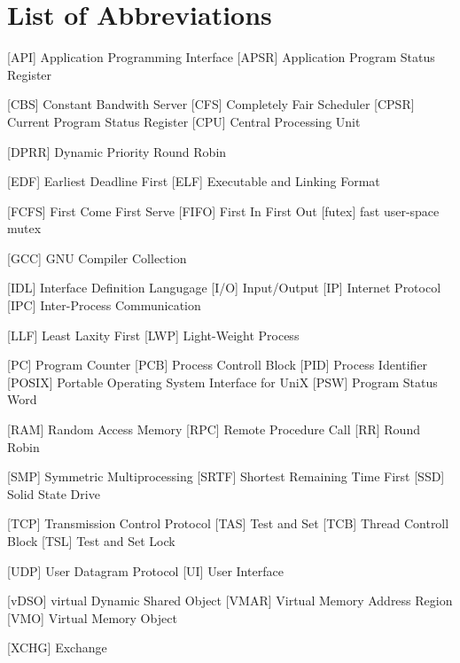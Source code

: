 
\chapter*{List of Abbreviations}

\begin{acronym} [POSIX]
 [API] {Application Programming Interface}
 [APSR] {Application Program Status Register}

 [CBS] {Constant Bandwith Server}
 [CFS] {Completely Fair Scheduler}
 [CPSR] {Current Program Status Register}
 [CPU] {Central Processing Unit}

 [DPRR] {Dynamic Priority Round Robin}

 [EDF] {Earliest Deadline First}
 [ELF] {Executable and Linking Format}

 [FCFS] {First Come First Serve}
 [FIFO] {First In First Out}
 [futex] {fast user-space mutex}

 [GCC] {GNU Compiler Collection}


 [IDL] {Interface Definition Langugage}
 [I/O] {Input/Output}
 [IP] {Internet Protocol}
[IPC] {Inter-Process Communication}



 [LLF] {Least Laxity First}
 [LWP] {Light-Weight Process}




 [PC] {Program Counter}
 [PCB] {Process Controll Block}
 [PID] {Process Identifier}
 [POSIX] {Portable Operating System Interface for UniX}
 [PSW] {Program Status Word}


  [RAM] {Random Access Memory}
 [RPC] {Remote Procedure Call}
 [RR] {Round Robin}

 [SMP] {Symmetric Multiprocessing}
 [SRTF] {Shortest Remaining Time First}
 [SSD] {Solid State Drive}

 [TCP] {Transmission Control Protocol}
 [TAS] {Test and Set}
 [TCB] {Thread Controll Block}
 [TSL] {Test and Set Lock}

 [UDP] {User Datagram Protocol} 
  [UI]  {User Interface}

 [vDSO] {virtual Dynamic Shared Object}
 [VMAR] {Virtual Memory Address Region}
  [VMO]  {Virtual Memory Object}


 [XCHG] {Exchange}



\end{acronym} 
